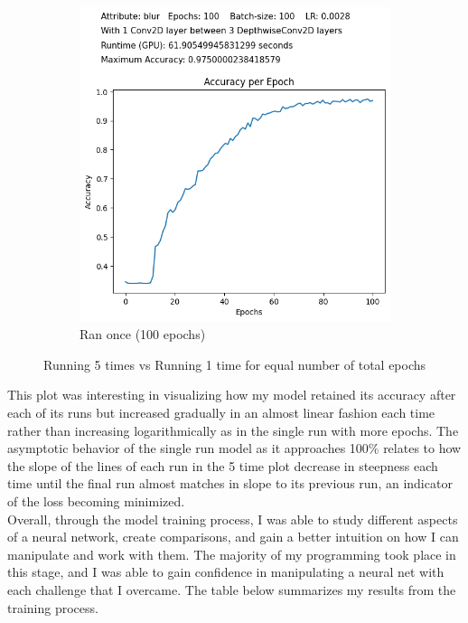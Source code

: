 \documentclass{article}
\begin{document}
\begin{figure}[h!]
\begin{subfigure}[b]{0.45\textwidth}
    \includegraphics[width=\textwidth]{BLUR1.png}
    \caption{Ran once (100 epochs)}
  \end{subfigure}
  \caption{Running 5 times vs Running 1 time for equal number of total epochs}
\end{figure}

This plot was interesting in visualizing how my model retained its accuracy after each of its runs but increased gradually in an almost linear fashion each time rather than increasing logarithmically as in the single run with more epochs. The asymptotic behavior of the single run model as it approaches 100\% relates to how the slope of the lines of each run in the 5 time plot decrease in steepness each time until the final run almost matches in slope to its previous run, an indicator of the loss becoming minimized.
\\

Overall, through the model training process, I was able to study different aspects of a neural network, create comparisons, and gain a better intuition on how I can manipulate and work with them. The majority of my programming took place in this stage, and I was able to gain confidence in manipulating a neural net with each challenge that I overcame. The table below summarizes my results from the training process.
\end{document}
